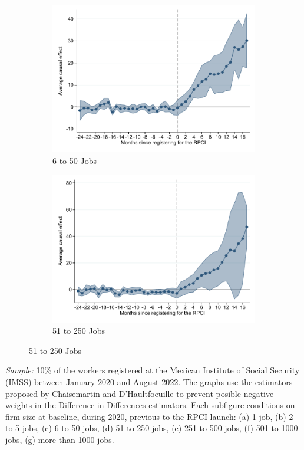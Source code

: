 \documentclass[oneside,11pt]{article}
\begin{document}
\begin{figure}[H]
\begin{center}
    \begin{subfigure}{0.49\textwidth}
    \caption{6 to 50 Jobs}
    \includegraphics[width=\textwidth]{04_Figures/muestra_10porciento/event_study_sal_cierre_chaisemartin_firm_size_3.pdf}
    \end{subfigure}
    \begin{subfigure}{0.49\textwidth}
    \caption{51 to 250 Jobs}
    \includegraphics[width=\textwidth]{04_Figures/muestra_10porciento/event_study_sal_cierre_chaisemartin_firm_size_4.pdf}
    \end{subfigure}
    
    \end{center}
\end{figure}
\scriptsize{
\noindent \textit{Sample:} 10\% of the workers registered at the Mexican Institute of Social Security (IMSS) between January 2020 and August 2022. The graphs use the estimators proposed by Chaisemartin and D'Haultfoeuille to prevent posible negative weights in the Difference in Differences estimators.  Each subfigure conditions on firm size at baseline, during 2020, previous to the RPCI launch: (a) 1 job, (b) 2 to 5 jobs, (c) 6 to 50 jobs, (d) 51 to 250 jobs, (e) 251 to 500 jobs, (f) 501 to 1000 jobs, (g) more than 1000 jobs.
}
\end{document}
